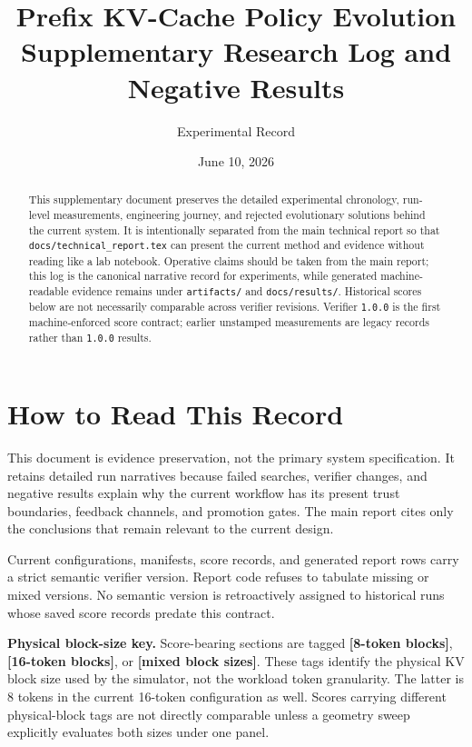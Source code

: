 \documentclass[11pt]{article}
\title{\textbf{\color{navy}Prefix KV-Cache Policy Evolution}\\
\large Supplementary Research Log and Negative Results}
\author{Experimental Record}
\date{June 10, 2026}
\newcommand{\filepath}[1]{\nolinkurl{#1}}
\newcommand{\identifier}[1]{\nolinkurl{#1}}
\newcommand{\important}[1]{\textbf{\color{navy}#1}}
\newcommand{\blocktag}[1]{\textbf{\color{navy}[#1-token blocks]}}
\newcommand{\mixedblocktag}{\textbf{\color{navy}[mixed block sizes]}}
\begin{document}
\maketitle

\begin{abstract}
This supplementary document preserves the detailed experimental chronology, run-level
measurements, engineering journey, and rejected evolutionary solutions behind the
current system.  It is intentionally separated from the main technical report so that
\filepath{docs/technical_report.tex} can present the current method and evidence
without reading like a lab notebook.  Operative claims should be taken from the main
report; this log is the canonical narrative record for experiments, while generated
machine-readable evidence remains under \filepath{artifacts/} and
\filepath{docs/results/}. Historical scores below are not necessarily comparable
across verifier revisions.  Verifier
\identifier{1.0.0} is the first machine-enforced score contract; earlier unstamped
measurements are legacy records rather than \identifier{1.0.0} results.
\end{abstract}

\tableofcontents
\newpage

\section{How to Read This Record}

This document is evidence preservation, not the primary system specification.  It
retains detailed run narratives because failed searches, verifier changes, and
negative results explain why the current workflow has its present trust boundaries,
feedback channels, and promotion gates.  The main report cites only the conclusions
that remain relevant to the current design.

Current configurations, manifests, score records, and generated report rows carry a
strict semantic verifier version.  Report code refuses to tabulate missing or mixed
versions.  No semantic version is retroactively assigned to historical runs whose
saved score records predate this contract.

\important{Physical block-size key.}  Score-bearing sections are tagged
\blocktag{8}, \blocktag{16}, or \mixedblocktag.  These tags identify the physical KV
block size used by the simulator, not the workload token granularity.  The latter is
8 tokens in the current 16-token configuration as well.  Scores carrying different
physical-block tags are not directly comparable unless a geometry sweep explicitly
evaluates both sizes under one panel.
\end{document}
